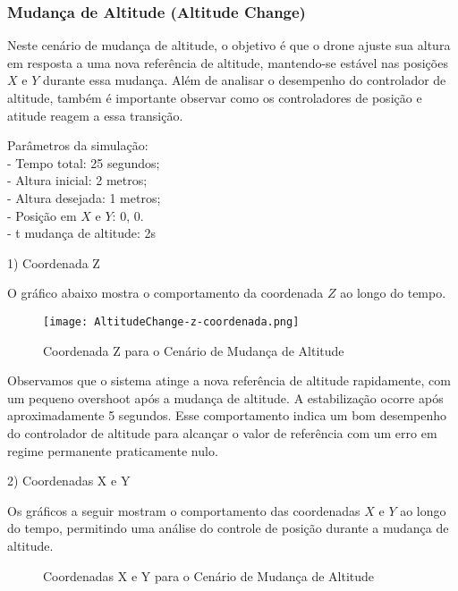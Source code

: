 \subsubsection{Mudança de Altitude (Altitude Change)}

Neste cenário de mudança de altitude, o objetivo é que o drone ajuste sua altura em resposta a uma nova referência de altitude, mantendo-se estável nas posições \(X\) e \(Y\) durante essa mudança. Além de analisar o desempenho do controlador de altitude, também é importante observar como os controladores de posição e atitude reagem a essa transição.

Parâmetros da simulação: \\

- Tempo total: 25 segundos;\\
- Altura inicial: 2 metros; \\
- Altura desejada: 1 metros; \\
- Posição em \(X\) e \(Y\): 0, 0. \\
- t mudança de altitude: 2s



1) Coordenada Z

O gráfico abaixo mostra o comportamento da coordenada \(Z\) ao longo do tempo.

\begin{figure}[H]
	\centering
	\texttt{[image: AltitudeChange-z-coordenada.png]}
	\caption{Coordenada Z para o Cenário de Mudança de Altitude}
	\label{fig:altitudechange-z-coordenada}
\end{figure}

Observamos que o sistema atinge a nova referência de altitude rapidamente, com um pequeno overshoot após a mudança de altitude. A estabilização ocorre após aproximadamente 5 segundos. Esse comportamento indica um bom desempenho do controlador de altitude para alcançar o valor de referência com um erro em regime permanente praticamente nulo.

2) Coordenadas X e Y

Os gráficos a seguir mostram o comportamento das coordenadas \(X\) e \(Y\) ao longo do tempo, permitindo uma análise do controle de posição durante a mudança de altitude.

\begin{figure}[htbp]
    \centering
    \hfill
    \caption{Coordenadas X e Y para o Cenário de Mudança de Altitude}
    \label{fig:altitudechange-x-y-coordenadas}
\end{figure}

